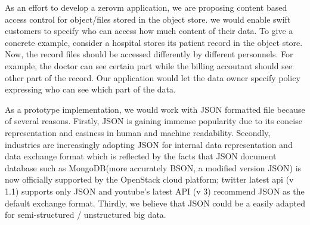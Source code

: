 As an effort to develop a  zerovm application, we are proposing content based access control for object/files  stored in the object store.  we would enable swift customers to specify who can access how much content of their data. To give a concrete example, consider a hospital stores its patient record  in the object store. Now, the record files should be accessed differently by different personnels. For example, the doctor can see certain part  while the billing accoutant should see other part of the record. Our application would let the data owner specify policy expressing who can see which part of the data.

As  a prototype implementation, we would work with JSON formatted file because of several reasons. Firstly, JSON is gaining immense popularity due to its concise representation and easiness in human and machine readability. Secondly, industries are increasingly adopting JSON for internal data representation and data exchange format which is reflected by the facts that JSON  document database such as MongoDB(more accurately BSON, a modified version JSON) is now officially supported by the OpenStack cloud platform; twitter latest api (v 1.1) supports only JSON and youtube’s latest API (v 3) \cite{identityv3} recommend JSON as the default exchange format. Thirdly, we believe that JSON could be a easily adapted  for semi-structured / unstructured big data. 


